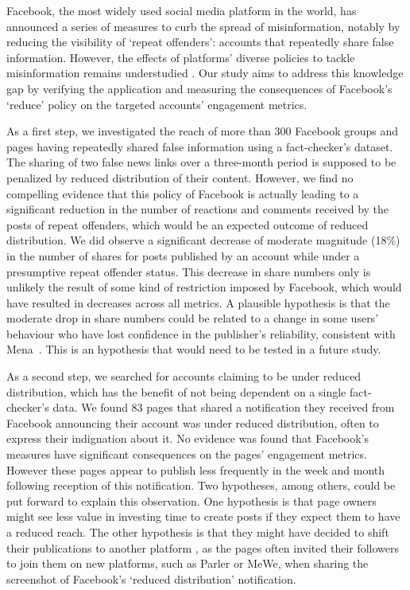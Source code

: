 \documentclass[11pt,a4paper]{article}
\begin{document}
{\color{red}
Facebook, the most widely used social media platform in the world, has announced a series of measures to curb the spread of misinformation, notably by reducing the visibility of `repeat offenders': accounts that repeatedly share false information. However, the effects of platforms' diverse policies to tackle misinformation remains understudied \citep{pasquetto2020tackling}. 
Our study aims to address this knowledge gap by verifying the application and measuring the consequences of Facebook's `reduce' policy on the targeted accounts' engagement metrics.

As a first step, we investigated the reach of more than 300 Facebook groups and pages having repeatedly shared false information using a fact-checker's dataset. 
The sharing of two false news links over a three-month period is supposed to be penalized by reduced distribution of their content. 
However, we find no compelling evidence that this policy of Facebook is actually leading to a significant reduction in the number of reactions and comments received by the posts of repeat offenders, which would be an expected outcome of reduced distribution. 
We did observe a significant decrease of moderate magnitude (18\%) in the number of shares for posts published by an account while under a presumptive repeat offender status. 
This decrease in share numbers only is unlikely the result of some kind of restriction imposed by Facebook, which would have resulted in decreases across all metrics. 
A plausible hypothesis is that the moderate drop in share numbers could be related to a change in some users’ behaviour who have lost confidence in the publisher’s reliability, consistent with Mena~. 
This is an hypothesis that would need to be tested in a future study. 

As a second step, we searched for accounts claiming to be under reduced distribution, which has the benefit of not being dependent on a single fact-checker’s data. 
We found 83 pages that shared a notification they received from Facebook announcing their account was under reduced distribution, often to express their indignation about it. 
No evidence was found that Facebook’s measures have significant consequences on the pages’ engagement metrics. 
However these pages appear to publish less frequently in the week and month following reception of this notification. 
Two hypotheses, among others, could be put forward to explain this observation. 
One hypothesis is that page owners might see less value in investing time to create posts if they expect them to have a reduced reach. 
The other hypothesis is that they might have decided to shift their publications to another platform \citep{rogers2020deplatforming, rauchfleisch2021deplatforming}, as the pages often invited their followers to join them on new platforms, such as Parler or MeWe, when sharing the screenshot of Facebook's `reduced distribution' notification.

}
\end{document}
